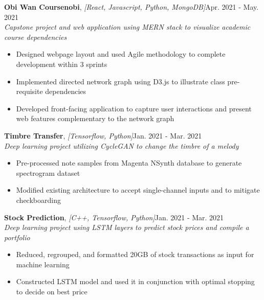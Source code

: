 \documentclass[12pt]{article}
\newcommand\firstboxx[2]{\textbf{\fontsize{12.8}{15}\selectfont #1}, \textit{#2}}
\newcommand{\itemheader}[3]{\firstboxx{#1}{#2}\hfill#3}
\begin{document}
\bigskip
\itemheader{Obi Wan Coursenobi}{[React, Javascript, Python, MongoDB]}{Apr. 2021 - May. 2021}
\\ \textit{Capstone project and web application using MERN stack to visualize academic course dependencies}
\begin{itemize}
\item Designed webpage layout and used Agile methodology to complete development within 3 sprints
\item Implemented directed network graph using D3.js to illustrate class pre-requisite dependencies
\item Developed front-facing application to capture user interactions and present web features complementary to the network graph
\end{itemize}

\bigskip
\itemheader{Timbre Transfer}{[Tensorflow, Python]}{Jan. 2021 - Mar. 2021}
\\ \textit{Deep learning project utilizing CycleGAN to change the timbre of a melody}
\begin{itemize}
\item Pre-processed note samples from Magenta NSynth database to generate spectrogram dataset
\item Modified existing architecture to accept single-channel inputs and to mitigate checkboarding
\end{itemize}

\bigskip
\itemheader{Stock Prediction}{[C++, Tensorflow, Python]}{Jan. 2021 - Mar. 2021}
\\ \textit{Deep learning project using LSTM layers to predict stock prices and compile a portfolio}
\begin{itemize}
\item Reduced, regrouped, and formatted 20GB of stock transactions as input for machine learning
\item Constructed LSTM model and used it in conjunction with optimal stopping to decide on best price
\end{itemize}

\end{document}
